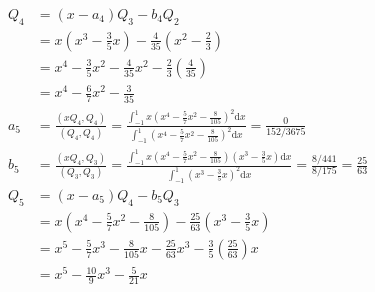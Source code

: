 {\begin{align*}
Q_4 &= (x- a_4) Q_3 - b_4 Q_2 \\
    &= x (x^3 - \frac{3}{5} x) - \frac{4}{35} (x^2 - \frac{2}{3}) \\
    &= x^4 - \frac{3}{5} x^2 - \frac{4}{35} x^2 - \frac{2}{3}
    (\frac{4}{35}) \\
    &\boxed{= x^4 - \frac{6}{7} x^2 - \frac{3}{35}}\\
a_5 &= \frac{(x Q_4, Q_4)}{(Q_4, Q_4)}
    = \frac{\int_{-1}^1 x (x^4 - \frac{5}{7} x^2
    - \frac{8}{105})^2 \textrm{d}x}{\int_{-1}^1 (x^4 - \frac{5}{ 7}
    x^2 - \frac{8}{105})^2 \textrm{d}x}
    = \frac{0}{152/3675} \\
b_5 &= \frac{(x Q_4, Q_3)}{(Q_3, Q_3)}
    = \frac{\int_{-1}^1 x (x^4 - \frac{5}{7} x^2 - \frac{8}{105})(x^3
    - \frac{3}{5} x) \textrm{d}x}{\int_{-1}^1 (x^3 - \frac{3}{5}
    x)^2 \textrm{d}x}
    = \frac{8/441}{8/175}
    = \frac{25}{63} \\
Q_5 &= (x - a_5) Q_4 - b_5 Q_3 \\
    &= x (x^4 - \frac{5}{7} x^2 - \frac{8}{105}) - \frac{25}{63} (x^3
    - \frac{3}{5} x) \\
    &= x^5 - \frac{5}{7} x^3 - \frac{8}{105} x - \frac{25}{63} x^3
    - \frac{3}{5} (\frac{25}{63}) x \\
    &\boxed{= x^5 - \frac{10}{9} x^3 - \frac{5}{21} x}
\end{align*}

}
